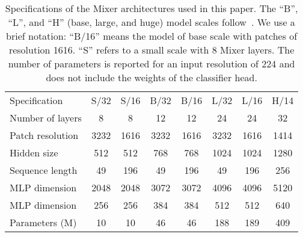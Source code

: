 \documentclass{article}
\newcommand{\name}{Mixer}
\begin{document}
\begin{table}[tb]
  \caption{Specifications of the \name{} architectures used in this paper. 
  The ``B'', ``L'', and ``H'' (base, large, and huge) model scales follow~\citet{Dosovitskiy2021}.
  We use a brief notation: ``B/16'' means the model of base scale with patches of resolution 1616.
  ``S'' refers to a small scale with 8 \name{} layers.
  The number of parameters is reported for an input resolution of 224 and does not include the weights of the classifier head.
  }
  \medskip
  \label{table:architecture-configs}
  \centering
  \begin{tabular}{@{}lccccccc@{}}
    \toprule
    Specification & S/32 & S/16 & B/32 & B/16 & L/32 & L/16 & H/14\\
    \cmidrule{1-8}
    Number of layers & 8 & 8 & 12 & 12 & 24 & 24 & 32\\
    Patch resolution  & 3232 & 1616 & 3232 & 1616 & 3232 & 1616 & 1414\\
    Hidden size  & 512 & 512 & 768 & 768 & 1024 & 1024 & 1280\\
    Sequence length  & 49 & 196 & 49 & 196 & 49 & 196 & 256\\
    MLP dimension  & 2048 & 2048 & 3072 & 3072 & 4096 & 4096 & 5120\\
    MLP dimension  & 256 & 256 & 384 & 384 & 512 & 512 & 640\\
    Parameters (M) & 10 & 10 & 46 & 46 & 188 & 189 & 409\\
    \bottomrule
  \end{tabular}
\end{table}
\end{document}
